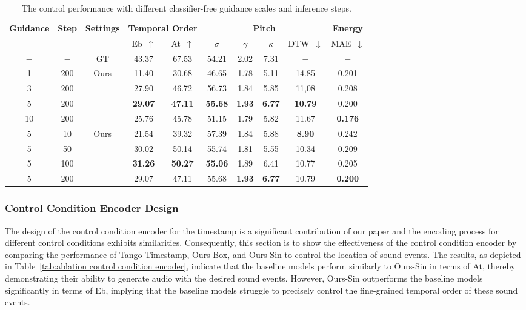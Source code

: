 \documentclass[letterpaper]{article}
\begin{document}
\begin{table}[!t]
    \centering
    \caption{The control performance with different classifier-free guidance scales and inference steps.}
    \label{tab:classifier-Free guidance and inference steps}
        \begin{tabular}{cc|c|cc|cccc|c}
        \toprule
        \multirow{2}{*}{\textbf{Guidance}} & \multirow{2}{*}{\textbf{Step}} & \multirow{2}{*}{\textbf{Settings}} & \multicolumn{2}{c}{\textbf{Temporal Order}} & \multicolumn{4}{|c}{\textbf{Pitch}} & \multicolumn{1}{|c}{\textbf{Energy}} \\
        & &  & Eb~$\uparrow$ & At~$\uparrow$ & $\sigma$ & $\gamma$ & $\kappa$ & DTW~$\downarrow$ & MAE~$\downarrow$ \\
        \midrule
        \midrule
         $-$ & $-$ & GT & 43.37 & 67.53 & 54.21 & 2.02 & 7.31 & $-$ & $-$ \\
         \midrule
         1 & 200 & \multirow{4}{*}{Ours} & 11.40 & 30.68 & 46.65 & 1.78 & 5.11 & 14.85 & 0.201 \\
         3 & 200 & & 27.90 & 46.72 & 56.73 & 1.84 & 5.85 & 11,08 & 0.208 \\
         5 & 200 & &  \textbf{29.07} & \textbf{47.11} & \textbf{55.68} & \textbf{1.93} & \textbf{6.77} & \textbf{10.79} & 0.200 \\
         10 & 200 & &  25.76 & 45.78 & 51.15 & 1.79 & 5.82 & 11.67 & \textbf{0.176} \\
         \midrule
         5 & 10 & \multirow{4}{*}{Ours} &  21.54 & 39.32 & 57.39 & 1.84 & 5.88 & \textbf{8.90} & 0.242 \\
         5 & 50 & &  30.02 & 50.14 & 55.74 & 1.81 & 5.55 & 10.34 & 0.209 \\
         5 & 100 & & \textbf{31.26} & \textbf{50.27} & \textbf{55.06} & 1.89 & 6.41 & 10.77 & 0.205 \\
         5 & 200 & &  29.07 & 47.11 & 55.68 & \textbf{1.93} & \textbf{6.77} & 10.79 & \textbf{0.200} \\
        \bottomrule
        \end{tabular}
\end{table}

\subsubsection{Control Condition Encoder Design} The design of the control condition encoder for the timestamp is a significant contribution of our paper and the encoding process for different control conditions exhibits similarities. Consequently, this section is to show the effectiveness of the control condition encoder by comparing the performance of Tango-Timestamp, Ours-Box, and Ours-Sin to control the location of sound events. The results, as depicted in Table~\ref{tab:ablation control condition encoder}, indicate that the baseline models perform similarly to Ours-Sin in terms of At, thereby demonstrating their ability to generate audio with the desired sound events. However, Ours-Sin outperforms the baseline models significantly in terms of Eb, implying that the baseline models struggle to precisely control the fine-grained temporal order of these sound events.
\end{document}
